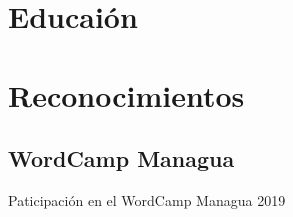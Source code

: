
\begin{minipage}[t]{0.33\textwidth} %


\section{Educaión} 
\vspace{\topsep} %
\vspace{1pt}
\vspace{6pt}



\sectionspace %

\section{Reconocimientos}
\subsection{WordCamp Managua}
Paticipación en el WordCamp Managua 2019
\sectionspace %


\end{minipage}
